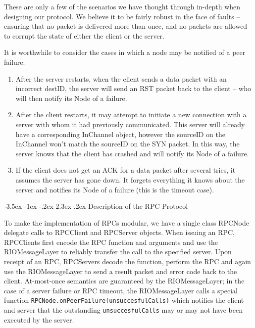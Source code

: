 \documentclass[12pt]{article}	%
\makeatletter
\renewcommand\section{\@startsection{section}{1}{\z@}%
                                 {-3.5ex \@plus -1ex \@minus -.2ex}%
                                 {2.3ex \@plus.2ex}%
                                 {\normalfont\large\bfseries}}
\makeatother
\begin{document}
These are only a few of the scenarios we have thought through in-depth when designing our protocol. We believe it to be fairly robust in the face of faults -- ensuring that no packet is delivered more than once, and no packets are allowed to corrupt the state of either the client or the server.

It is worthwhile to consider the cases in which a node may be notified of a peer failure:

\begin{enumerate}
\item After the server restarts, when the client sends a data packet with an incorrect destID, the server will send an RST packet back to the client -- who will then notify its Node of a failure.
\item After the client restarts, it may attempt to initiate a new connection with a server with whom it had previously communicated. This server will already have a corresponding InChannel object, however the sourceID on the InChannel won't match the sourceID on the SYN packet. In this way, the server knows that the client has crashed and will notify its Node of a failure.
\item If the client does not get an ACK for a data packet after several tries, it assumes the server has gone down. It forgets everything it knows about the server and notifies its Node of a failure (this is the timeout case).
\end{enumerate}

\section{Description of the RPC Protocol}

To make the implementation of RPCs modular, we have a single class RPCNode delegate calls to RPCClient and RPCServer objects. When issuing an RPC, RPCClients first encode the RPC function and arguments and use the RIOMessageLayer to reliably transfer the call to the specified server. Upon receipt of an RPC, RPCServers decode the function, perform the RPC and again use the RIOMessageLayer to send a result packet and error code back to the client. At-most-once semantics are guaranteed by the RIOMessageLayer; in the case of a server failure or RPC timeout, the RIOMessageLayer calls a special function {\tt RPCNode.onPeerFailure(unsuccesfulCalls)} which notifies the client and server that the outstanding {\tt unsuccesfulCalls} may or may not have been executed by the server.
\end{document}
